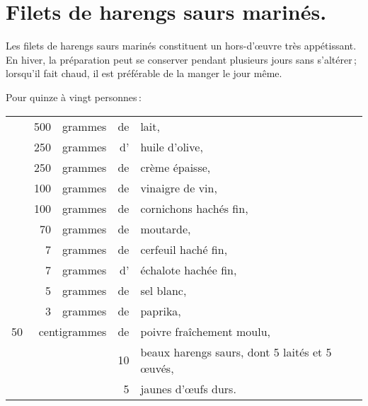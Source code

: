 \section*{\centering Filets de harengs saurs marinés.}

Les filets de harengs saurs marinés constituent un hors-d'œuvre très
appétissant. En hiver, la préparation peut se conserver pendant plusieurs jours
sans s'altérer ; lorsqu'il fait chaud, il est préférable de la manger le jour
même.

\medskip

Pour quinze à vingt personnes :

\medskip

\footnotesize
\begin{longtable}{rrrrp{16em}}
   & 500 & grammes & de & lait,                                                                           \\
   & 250 & grammes & d' & huile d'olive,                                                                  \\
   & 250 & grammes & de & crème épaisse,                                                                  \\
   & 100 & grammes & de & vinaigre de vin,                                                                \\
   & 100 & grammes & de & cornichons hachés fin,                                                          \\
   &  70 & grammes & de & moutarde,                                                                       \\
   &   7 & grammes & de & cerfeuil haché fin,                                                             \\
   &   7 & grammes & d' & échalote hachée fin,                                                            \\
   &   5 & grammes & de & sel blanc,                                                                      \\
   &   3 & grammes & de & paprika,                                                                        \\
50 & \multicolumn{2}{r}{centigrammes} & de & poivre fraîchement moulu,                                    \\
   &     &         & 10 & beaux harengs saurs, dont 5 laités et 5 œuvés,                                  \\
   &     &         &  5 & jaunes d'œufs durs.                                                             \\
\end{longtable}
\normalsize

